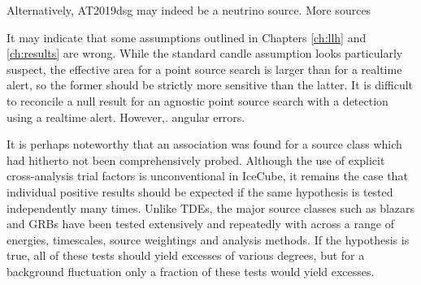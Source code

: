 Alternatively, AT2019dsg may indeed be a neutrino source. More sources

It may indicate that some assumptions outlined in Chapters \ref{ch:llh} and \ref{ch:results} are wrong. While the standard candle assumption looks particularly suspect, the effective area for a point source search is larger than for a realtime alert, so the former should be strictly more sensitive than the latter. It is difficult to reconcile a null result for an agnostic point source search with a detection using a realtime alert. However,. angular errors.

It is perhaps noteworthy that an association was found for a source class which had hitherto not been comprehensively probed. Although the use of explicit cross-analysis trial factors is unconventional in IceCube, it remains the case that individual positive results should be expected if the same hypothesis is tested independently many times. Unlike TDEs, the major source classes such as blazars and GRBs have been tested extensively and repeatedly with across a range of energies, timescales, source weightings and analysis methods. If the hypothesis is true, all of these tests should yield excesses of various degrees, but for a background fluctuation only a fraction of these tests would yield excesses.